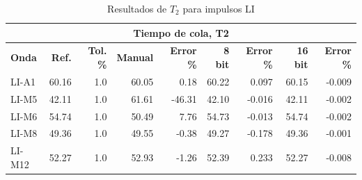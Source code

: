 \begin{table}[H]
    \centering
    \begin{tabular}{@{}lrrrrrrrr@{}}
        \toprule
        \multicolumn{9}{c}{\textbf{Tiempo de cola, T2}}                                                                                                                   \\ \midrule
        \textbf{Onda} & \textbf{Ref.} & \textbf{Tol. \%} & \textbf{Manual} & \textbf{Error \%} & \textbf{8 bit} & \textbf{Error \%} & \textbf{16 bit} & \textbf{Error \%} \\ \midrule
        LI-A1         & 60.16         & 1.0              & 60.05           & 0.18              & 60.22          & 0.097             & 60.15           & -0.009            \\ \midrule
        LI-M5         & 42.11         & 1.0              & 61.61           & -46.31            & 42.10          & -0.016            & 42.11           & -0.002            \\ \midrule
        LI-M6         & 54.74         & 1.0              & 50.49           & 7.76              & 54.73          & -0.013            & 54.74           & -0.002            \\ \midrule
        LI-M8         & 49.36         & 1.0              & 49.55           & -0.38             & 49.27          & -0.178            & 49.36           & -0.001            \\ \midrule
        LI-M12        & 52.27         & 1.0              & 52.93           & -1.26             & 52.39          & 0.233             & 52.27           & -0.008            \\ \bottomrule
    \end{tabular}
    \caption{Resultados de $T_2$ para impulsos LI}
    \label{tab:resultados_t2_li}
\end{table}

